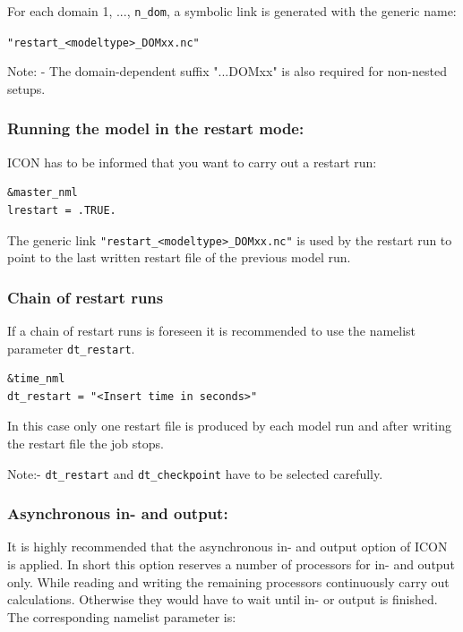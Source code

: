 For each domain 1, ..., \verb+n_dom+, a symbolic link is generated with the generic name: 

 \verb+"restart_<modeltype>_DOMxx.nc"+

     
     
 
Note:
    -  The domain-dependent suffix "...DOMxx" is also required for 
non-nested setups.

    


\subsubsection{Running the model in the restart mode:}

ICON has to be informed that you want to carry out a restart run:

\begin{verbatim}
&master_nml
lrestart = .TRUE. 
\end{verbatim}

The generic link \verb+"restart_<modeltype>_DOMxx.nc"+ is used by the restart run to point to the last written restart file of the previous model run. 


\subsubsection*{Chain of restart runs}

If a chain of restart runs is foreseen it is recommended to use the namelist parameter
\verb+dt_restart+. 

\begin{verbatim}
&time_nml
dt_restart = "<Insert time in seconds>" 
\end{verbatim}


In this case only one restart file is produced by each model run and after writing the restart file the job stops.

Note:- \verb+dt_restart+ and \verb+dt_checkpoint+ have to be selected carefully. 
 


\subsubsection*{Asynchronous in- and  output:} 

It is highly recommended that the asynchronous in- and output option of ICON is applied. In short this option reserves a number of processors for in- and output only.  While reading and writing the remaining processors continuously carry out calculations. Otherwise they would have to wait until in- or output is finished. The corresponding namelist parameter is:

